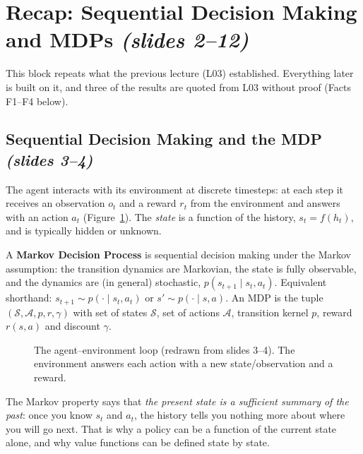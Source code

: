 \documentclass[11pt,a4paper]{article}
\newcommand{\cS}{\mathcal{S}}
\newcommand{\cA}{\mathcal{A}}
\newcommand{\slides}[1]{\texorpdfstring{\emph{(slides #1)}}{(slides #1)}}
\theoremstyle{plain}
\theoremstyle{definition}
\theoremstyle{remark}
\newcommand{\figref}[1]{Figure~\ref{#1}}
\begin{document}
\tableofcontents
\newpage
\section{Recap: Sequential Decision Making and MDPs \slides{2--12}}
This block repeats what the previous lecture (L03) established. Everything later is built on it, and three of the results are quoted from L03 without proof (Facts F1--F4 below).

\subsection{Sequential Decision Making and the MDP \slides{3--4}}
The agent interacts with its environment at discrete timesteps: at each step it receives an observation $o_t$ and a reward $r_t$ from the environment and answers with an action $a_t$ (\figref{fig:loop}). The \emph{state} is a function of the history, $s_t=f(h_t)$, and is typically hidden or unknown.

A \textbf{Markov Decision Process} is sequential decision making under the Markov assumption: the transition dynamics are Markovian, the state is fully observable, and the dynamics are (in general) stochastic, $p(s_{t+1}\mid s_t,a_t)$. Equivalent shorthand: $s_{t+1}\sim p(\cdot\mid s_t,a_t)$ or $s'\sim p(\cdot\mid s,a)$. An MDP is the tuple $(\cS,\cA,p,r,\gamma)$ with set of states $\cS$, set of actions $\cA$, transition kernel $p$, reward $r(s,a)$ and discount $\gamma$.

\begin{figure}[htbp]
\centering
{}
\caption{The agent--environment loop (redrawn from slides 3--4). The environment answers each action with a new state/observation and a reward.}
\label{fig:loop}
\end{figure}

\begin{intuition}
The Markov property says that \emph{the present state is a sufficient summary of the past}: once you know $s_t$ and $a_t$, the history tells you nothing more about where you will go next. That is why a policy can be a function of the current state alone, and why value functions can be defined state by state.
\end{intuition}
\end{document}
